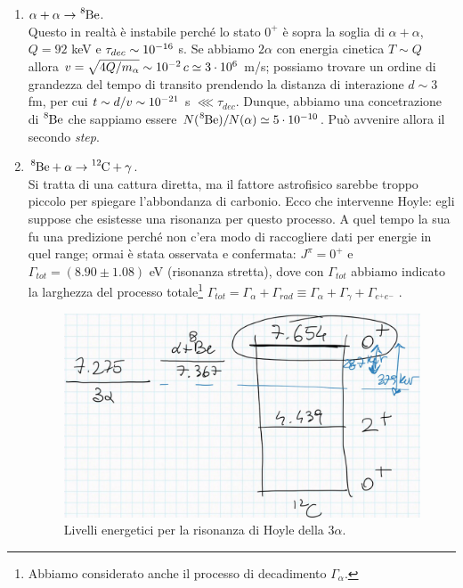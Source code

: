 \begin{enumerate}[1)]
	\item $\alpha +\alpha \to \ce{^8Be}$.\\ 
	Questo in realtà è instabile perché lo stato $0^+$ è sopra la soglia di $\alpha+\alpha$, $Q=92$ keV e $\tau_{dec}\sim 10^{-16}$ s. Se abbiamo $2\alpha$ con energia cinetica $T\sim Q$ allora $v= \sqrt{4Q/m_\alpha}\sim 10^{-2}\, c \simeq 3\cdot10^{6}$ m/s; possiamo trovare un ordine di grandezza del tempo di transito prendendo la distanza di interazione $d\sim 3$ fm, per cui $t\sim d/v \sim 10^{-21}$ s $\lll \tau_{dec}$. Dunque, abbiamo una  concetrazione di $\ce{^8Be}$ che sappiamo essere $N(\ce{^8Be})/N(\alpha)\simeq 5\cdot\ord{-10}$. Può avvenire allora il secondo \textit{step}.
	\item $\ce{^8Be + \alpha \to \ce{^{12}C} +\gamma}$.\\ 
	Si tratta di una cattura diretta, ma il fattore astrofisico sarebbe troppo piccolo per spiegare l'abbondanza di carbonio. Ecco che intervenne Hoyle: egli suppose che esistesse una risonanza per questo processo. A quel tempo la sua fu una predizione perché non c'era modo di raccogliere dati per energie in quel range; ormai è stata osservata e confermata: $J^{\pi}=0^+$ e $\Gamma_{tot} = (8.90 \pm 1.08)$ eV (risonanza stretta), dove con $\Gamma_{tot}$ abbiamo indicato la larghezza del processo totale\footnote{Abbiamo considerato anche il processo di decadimento $\Gamma_\alpha$.} $\Gamma_{tot} = \Gamma_\alpha + \Gamma_{rad}\equiv \Gamma_\alpha + \Gamma_\gamma + \Gamma_{e^+e^-}$ .
	\begin{figure}[!h]
		\centering
		\includegraphics[scale=0.4]{Immagini/0421_riso.png}
		\caption{Livelli energetici per la risonanza di Hoyle della $3\alpha$.}
		\label{0421_hoyle}
	\end{figure}
\end{enumerate}
